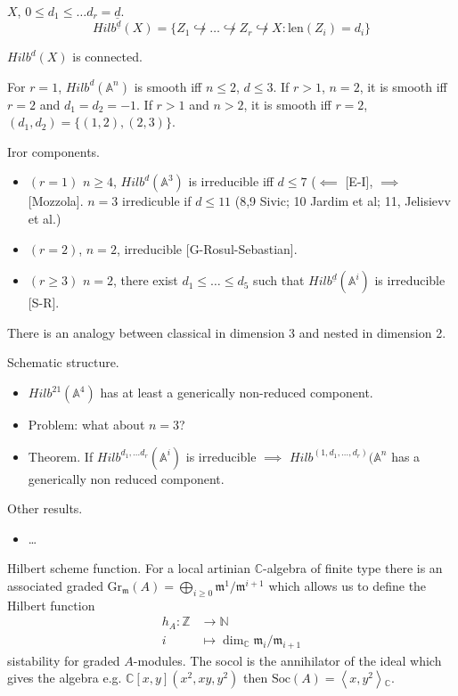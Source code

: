 \begin{definition}
\label{definition-nested-Hilbert-scheme}
$X$, $0 \leq d_1 \leq \ldots
d_r=\underline{d}$.
$$
Hilb^{\underline{d}}(X)=
\{Z_1\not\hookrightarrow
\ldots
\not\hookrightarrow Z_r  \not\hookrightarrow
X:
\text{len}(Z_i)=d_i\}
$$
\end{definition}

\begin{theorem}[Hartshorne (r=0), Fogarty,
Kalpan (r>1)]
\label{theorem-HK}
$Hilb^d(X)$ is connected.
\end{theorem}

For $r=1$, $Hilb^d(\mathbb{A}^n)$ is smooth
iff
$n \leq 2$, $d \leq 3$.
If $r>1$, $n=2$, it is smooth iff $r=2$ and
$d_1=d_2=-1$.
If $r>1$ and $n>2$, it is smooth iff $r=2$,
$(d_1,d_2)=\{(1,2),(2,3)\}$.

Iror components.
\begin{itemize}
\item $(r=1)$ $n\geq 4$,
$Hilb^d(\mathbb{A}^3)$
is irreducible iff $d\leq 7$ ($\impliedby$
[E-I], $\implies $ [Mozzola].
$n=3$ irredicuble if $d \leq  11$ (8,9 Sivic;
10 Jardim et al; 11, Jelisievv et
al.)
\item $(r=2)$, $n=2$, irreducible
[G-Rosul-Sebastian].
\item $(r \geq 3)$ $n=2$, there exist $d_1
\leq \ldots \leq d_5$
such that
$Hilb^{\underline{d}}(\mathbb{A}^i)$ is
irreducible [S-R].
\end{itemize}

There is an analogy between classical in
dimension 3
and nested in dimension 2.

Schematic structure.
\begin{itemize}
\item [I] $Hilb^{21}(\mathbb{A}^4)$ has at
least a generically
non-reduced component.
\item Problem: what about $n=3$?
\item Theorem. If $Hilb^{d_1,\ldots
d_r}(\mathbb{A}^i)$ is
irreducible $\implies $
$Hilb^{(1,d_1,\ldots,d_r)}(\mathbb{A}^n$
has a generically non reduced component.
\end{itemize}

Other results.
\begin{itemize}
\item …
\end{itemize}
Hilbert scheme function.
For a local artinian $\mathbb{C}$-algebra of
finite type there is an associated graded
$\text{Gr}_\mathfrak{m}(A)
=\bigoplus_{i \geq
0}\mathfrak{m}^1/\mathfrak{m}^{i+1}$
which allows us to define the Hilbert
function
$$
\begin{aligned}
h_A: \mathbb{Z} &\longrightarrow \mathbb{N}
\\
i &\longmapsto \dim_\mathbb{C}
\mathfrak{m}_i/\mathfrak{m}_{i+1}
\end{aligned}
$$
sistability for graded $A$-modules.
The socol is the annihilator of
the ideal which gives the algebra
e.g. $\mathbb{C}[x,y](x^2,xy,y^2)$ then
$\text{Soc}(A)=\left\langle{}x,y^2\right\rangle{}_\mathbb{C}
$.

